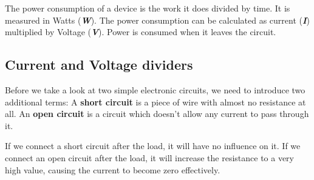 The power consumption of a device is the work it does divided by time.
It is measured in Watts (\textbf{\textit{W}}).
The power consumption can be calculated as current (\textbf{\textit{I}})
multiplied by Voltage (\textbf{\textit{V}}).
Power is consumed when it leaves the circuit.

\subsection{Current and Voltage dividers}
Before we take a look at two simple electronic circuits, we need to
introduce two additional terms:
A \textbf{short circuit} is a piece of wire with almost no resistance at all.
An \textbf{open circuit} is a circuit which doesn't allow any
current to pass through it.

If we connect a short circuit after the load, it will have no influence on it.
If we connect an open circuit after the load, it will increase the resistance
to a very high value, causing the current to become zero effectively.


